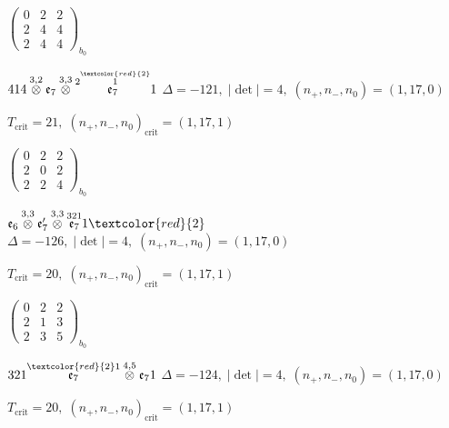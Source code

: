 \documentclass[10pt]{article}
\begin{document}
\hspace{2em}$\left(\begin{smallmatrix}0 & 2 & 2 \\ 2 & 4 & 4 \\ 2 & 4 & 4\end{smallmatrix}\right)_{\!b_0}$

\smallskip

$414\overset{3,2}{\otimes}\mathfrak{e}_7\overset{3,3}{\otimes}\overset{2\overset{\textcolor{red}{2}}{1}}{\mathfrak{e}_7}1$ \quad $\Delta=-121,\; |\det|=4,\; (n_+,n_-,n_0)=(1,17,0)$

\hspace{1em}$T_{\text{crit}}=21,\; (n_+,n_-,n_0)_{\text{crit}}=(1,17,1)$

\hspace{2em}$\left(\begin{smallmatrix}0 & 2 & 2 \\ 2 & 0 & 2 \\ 2 & 2 & 4\end{smallmatrix}\right)_{\!b_0}$

\smallskip

$\mathfrak{e}_6\overset{3,3}{\otimes}\mathfrak{e}_7'\overset{3,3}{\otimes}\overset{321}{\mathfrak{e}_7}1\textcolor{red}{2}$ \quad $\Delta=-126,\; |\det|=4,\; (n_+,n_-,n_0)=(1,17,0)$

\hspace{1em}$T_{\text{crit}}=20,\; (n_+,n_-,n_0)_{\text{crit}}=(1,17,1)$

\hspace{2em}$\left(\begin{smallmatrix}0 & 2 & 2 \\ 2 & 1 & 3 \\ 2 & 3 & 5\end{smallmatrix}\right)_{\!b_0}$

\smallskip

$321\overset{\textcolor{red}{2}1}{\mathfrak{e}_7}\overset{4,5}{\otimes}\mathfrak{e}_71$ \quad $\Delta=-124,\; |\det|=4,\; (n_+,n_-,n_0)=(1,17,0)$

\hspace{1em}$T_{\text{crit}}=20,\; (n_+,n_-,n_0)_{\text{crit}}=(1,17,1)$
\end{document}
